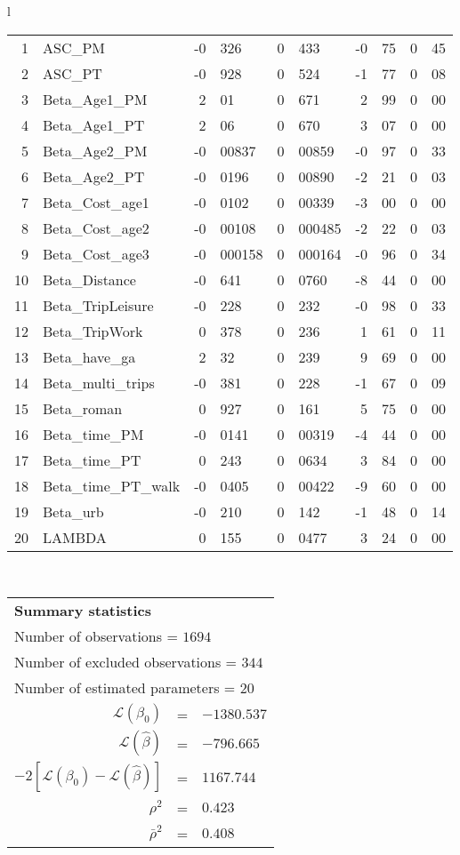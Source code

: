 \begin{tabular}{l}
\begin{tabular}{rlr@{.}lr@{.}lr@{.}lr@{.}l}
1 & ASC_PM  & -0&326 & 0&433 & -0&75 & 0&45\\
2 & ASC_PT & -0&928 & 0&524 & -1&77 & 0&08\\
3 & Beta_Age1_PM & 2&01 & 0&671 & 2&99 & 0&00\\
4 & Beta_Age1_PT & 2&06 & 0&670 & 3&07 & 0&00\\
5 & Beta_Age2_PM & -0&00837 & 0&00859 & -0&97 & 0&33\\
6 & Beta_Age2_PT & -0&0196 & 0&00890 & -2&21 & 0&03\\
7 & Beta_Cost_age1 & -0&0102 & 0&00339 & -3&00 & 0&00\\
8 & Beta_Cost_age2 & -0&00108 & 0&000485 & -2&22 & 0&03\\
9 & Beta_Cost_age3 & -0&000158 & 0&000164 & -0&96 & 0&34\\
10 & Beta_Distance & -0&641 & 0&0760 & -8&44 & 0&00\\
11 & Beta_TripLeisure & -0&228 & 0&232 & -0&98 & 0&33\\
12 & Beta_TripWork & 0&378 & 0&236 & 1&61 & 0&11\\
13 & Beta_have_ga & 2&32 & 0&239 & 9&69 & 0&00\\
14 & Beta_multi_trips & -0&381 & 0&228 & -1&67 & 0&09\\
15 & Beta_roman & 0&927 & 0&161 & 5&75 & 0&00\\
16 & Beta_time_PM & -0&0141 & 0&00319 & -4&44 & 0&00\\
17 & Beta_time_PT & 0&243 & 0&0634 & 3&84 & 0&00\\
18 & Beta_time_PT_walk & -0&0405 & 0&00422 & -9&60 & 0&00\\
19 & Beta_urb & -0&210 & 0&142 & -1&48 & 0&14\\
20 & LAMBDA & 0&155 & 0&0477 & 3&24 & 0&00\\
\hline
\end{tabular}
\\
\begin{tabular}{rcl}
\multicolumn{3}{l}{\bf Summary statistics}\\
\multicolumn{3}{l}{ Number of observations = $1694$} \\
\multicolumn{3}{l}{ Number of excluded observations = $344$} \\
\multicolumn{3}{l}{ Number of estimated  parameters = $20$} \\
 $\mathcal{L}(\beta_0)$ &=&  $-1380.537$ \\
 $\mathcal{L}(\hat{\beta})$ &=& $-796.665 $  \\
 $-2[\mathcal{L}(\beta_0) -\mathcal{L}(\hat{\beta})]$ &=& $1167.744$ \\
    $\rho^2$ &=&   $0.423$ \\
    $\bar{\rho}^2$ &=&    $0.408$ \\
\end{tabular}
  \end{tabular}
